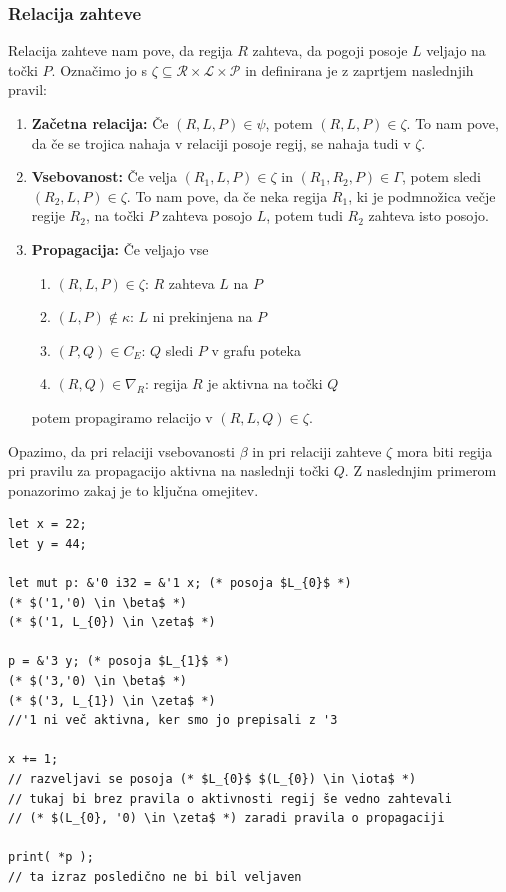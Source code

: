 \documentclass{article}
\begin{document}
\subsubsection{Relacija zahteve}

Relacija zahteve nam pove, da regija $R$ zahteva, da pogoji posoje $L$ veljajo na točki $P$. Označimo jo s
$\zeta \subseteq \mathcal{R} \times \mathcal{L} \times \mathcal{P}$ in definirana je z zaprtjem naslednjih pravil:
\begin{enumerate}
	\item \textbf{Začetna relacija:} Če $(R, L, P) \in \psi$, potem $(R, L, P) \in \zeta$. To nam pove, da če se trojica
	      nahaja v relaciji posoje regij, se nahaja tudi v $\zeta$.
	\item \textbf{Vsebovanost:} Če velja $(R_{1}, L, P) \in \zeta$ in $(R_{1}, R_{2}, P) \in \Gamma$, potem sledi
	      $(R_{2}, L, P) \in \zeta$. To nam pove, da če neka regija $R_{1}$, ki je podmnožica večje regije $R_{2}$, na točki $P$
	      zahteva posojo $L$, potem tudi $R_{2}$ zahteva isto posojo.
	\item \textbf{Propagacija:} Če veljajo vse \begin{enumerate}
		      \item $(R,L,P) \in \zeta$: $R$ zahteva $L$ na $P$
		      \item $(L, P) \notin \kappa$: $L$ ni prekinjena na $P$
		      \item $(P, Q) \in C_{E}$: $Q$ sledi $P$ v grafu poteka
		      \item $(R,Q) \in \nabla_{R}$: regija $R$ je aktivna na točki $Q$
	      \end{enumerate}
	      potem propagiramo relacijo v $(R,L,Q) \in \zeta$.
\end{enumerate}

Opazimo, da pri relaciji vsebovanosti $\beta$ in pri relaciji zahteve $\zeta$ mora biti regija pri pravilu
za propagacijo aktivna na naslednji točki $Q$. Z naslednjim primerom ponazorimo zakaj je to ključna omejitev.

\begin{lstlisting}
let x = 22;
let y = 44;

let mut p: &'0 i32 = &'1 x; (* posoja $L_{0}$ *)
(* $('1,'0) \in \beta$ *)
(* $('1, L_{0}) \in \zeta$ *)

p = &'3 y; (* posoja $L_{1}$ *)
(* $('3,'0) \in \beta$ *)
(* $('3, L_{1}) \in \zeta$ *)
//'1 ni več aktivna, ker smo jo prepisali z '3 

x += 1;
// razveljavi se posoja (* $L_{0}$ $(L_{0}) \in \iota$ *)
// tukaj bi brez pravila o aktivnosti regij še vedno zahtevali 
// (* $(L_{0}, '0) \in \zeta$ *) zaradi pravila o propagaciji 

print( *p );
// ta izraz posledično ne bi bil veljaven
\end{lstlisting}
\end{document}
